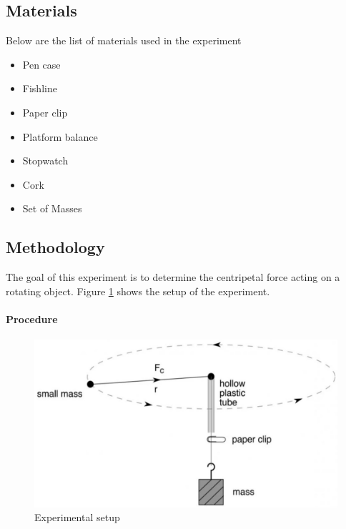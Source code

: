\documentclass[a4paper,12pt]{article}
\begin{document}
\subsection{Materials}
Below are the list of materials used in the experiment
\begin{itemize}
    \item Pen case
    \item Fishline
    \item Paper clip
    \item Platform balance
    \item Stopwatch
    \item Cork
    \item Set of Masses
\end{itemize}

\subsection{Methodology}
The goal of this experiment is to determine the centripetal force acting on a rotating object. Figure \ref{fig:setup} shows the setup of the experiment.


\paragraph{Procedure}

\begin{figure}[]
    \centering
    \includegraphics[width=1\textwidth]{experiment_setup.png}
    \caption{Experimental setup}
    \label{fig:setup}
\end{figure}
\end{document}
